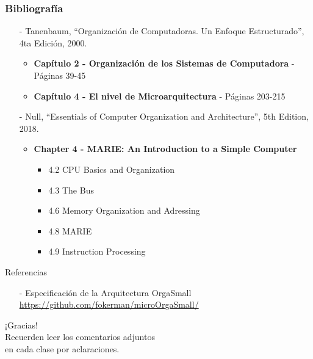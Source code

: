 \documentclass[aspectratio=169]{beamer}
\begin{document}
\begin{frame}[fragile]
    \frametitle{Bibliografía}
    \begin{itemize}
     \setlength\itemsep{0.5cm}
    \item[-] \small Tanenbaum, “Organización de Computadoras. Un Enfoque Estructurado”, 4ta Edición, 2000.\\
    \begin{itemize}
     \item \textbf{Capítulo 2 - Organización de los Sistemas de Computadora} - Páginas 39-45
     \item \textbf{Capítulo 4 - El nivel de Microarquitectura} - Páginas 203-215
    \end{itemize}
    \item[-] \small Null, “Essentials of Computer Organization and Architecture”, 5th Edition, 2018.\\
    \begin{itemize}
     \item \textbf{Chapter 4 - MARIE: An Introduction to a Simple Computer}
     \begin{itemize}
     \item 4.2 CPU Basics and Organization
     \item 4.3 The Bus
     \item 4.6 Memory Organization and Adressing
     \item 4.8 MARIE
     \item 4.9 Instruction Processing
     \end{itemize}
    \end{itemize}
    \end{itemize}
     \textcolor{naranjauca}{Referencias}
     \begin{itemize}
    \item[-] Especificación de la Arquitectura OrgaSmall\\ \small \url{https://github.com/fokerman/microOrgaSmall/}
    \end{itemize}
\end{frame}


\begin{frame}[plain]
    \begin{center}
    \vspace{2cm}
    \huge ¡Gracias!\\
    \vspace{2cm}
    \normalsize Recuerden leer los comentarios adjuntos\\ en cada clase por aclaraciones.
    \end{center}
\end{frame}
\end{document}
